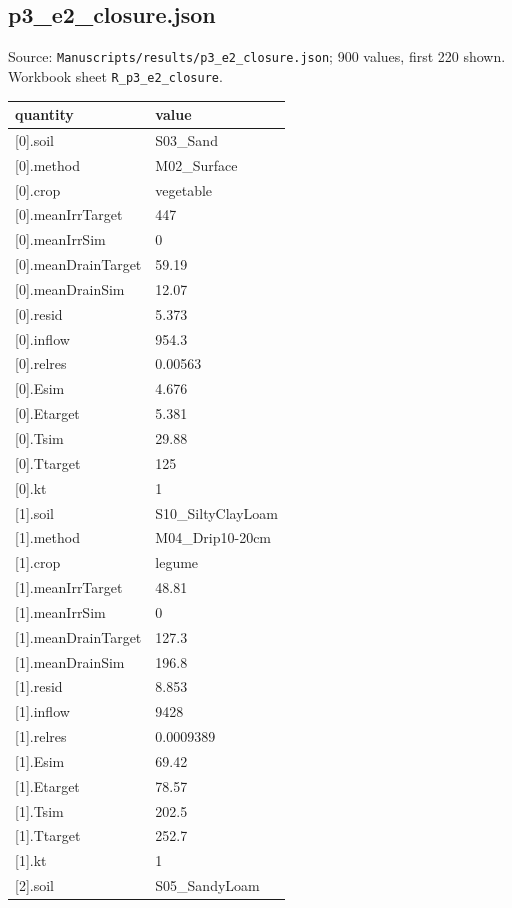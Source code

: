\subsection*{p3\_e2\_closure.json}
\noindent\small Source: \nolinkurl{Manuscripts/results/p3_e2_closure.json}; 900 values, first 220 shown. Workbook sheet \texttt{R\_p3\_e2\_closure}.\par
{\scriptsize\begin{longtable}{p{}p{}}\toprule\textbf{quantity} & \textbf{value}\\\midrule\endhead
{}[0].soil & S03\_Sand\\
{}[0].method & M02\_Surface\\
{}[0].crop & vegetable\\
{}[0].meanIrrTarget & 447\\
{}[0].meanIrrSim & 0\\
{}[0].meanDrainTarget & 59.19\\
{}[0].meanDrainSim & 12.07\\
{}[0].resid & 5.373\\
{}[0].inflow & 954.3\\
{}[0].relres & 0.00563\\
{}[0].Esim & 4.676\\
{}[0].Etarget & 5.381\\
{}[0].Tsim & 29.88\\
{}[0].Ttarget & 125\\
{}[0].kt & 1\\
{}[1].soil & S10\_SiltyClayLoam\\
{}[1].method & M04\_Drip10-20cm\\
{}[1].crop & legume\\
{}[1].meanIrrTarget & 48.81\\
{}[1].meanIrrSim & 0\\
{}[1].meanDrainTarget & 127.3\\
{}[1].meanDrainSim & 196.8\\
{}[1].resid & 8.853\\
{}[1].inflow & 9428\\
{}[1].relres & 0.0009389\\
{}[1].Esim & 69.42\\
{}[1].Etarget & 78.57\\
{}[1].Tsim & 202.5\\
{}[1].Ttarget & 252.7\\
{}[1].kt & 1\\
{}[2].soil & S05\_SandyLoam\\

\end{longtable}}
